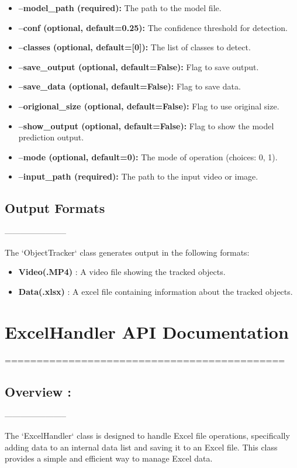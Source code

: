 \documentclass{article}
\begin{document}
\begin{itemize}
    \item {\textbf{--model\_path (required):}} The path to the model file.
    \item {\textbf{--conf (optional, default=0.25):}} The confidence threshold for detection.
    \item {\textbf{--classes (optional, default=[0]):}} The list of classes to detect.
    \item {\textbf{--save\_output (optional, default=False):}} Flag to save output.
    \item {\textbf{--save\_data (optional, default=False):}} Flag to save data.
    \item {\textbf{--origional\_size (optional, default=False):}} Flag to use original size.
    \item {\textbf{--show\_output (optional, default=False):}} Flag to show the model prediction output.
    \item {\textbf{--mode (optional, default=0):}} The mode of operation (choices: 0, 1).
    \item {\textbf{--input\_path (required):}} The path to the input video or image.
\end{itemize}

\subsection{Output Formats}
-----------------------

    The `ObjectTracker` class generates output in the following formats:
    \begin{itemize}
        \item \textbf{Video(.MP4)} : A video file showing the tracked objects.
        \item \textbf{Data(.xlsx)} : A excel file containing information about the tracked objects.
    \end{itemize}


\section{ExcelHandler API Documentation}
============================================

\subsection{Overview :}
-----------------------

    The `ExcelHandler` class is designed to handle Excel file operations, specifically adding data to an internal data list and saving it to an Excel file. This class provides a simple and efficient way to manage Excel data.
\end{document}
